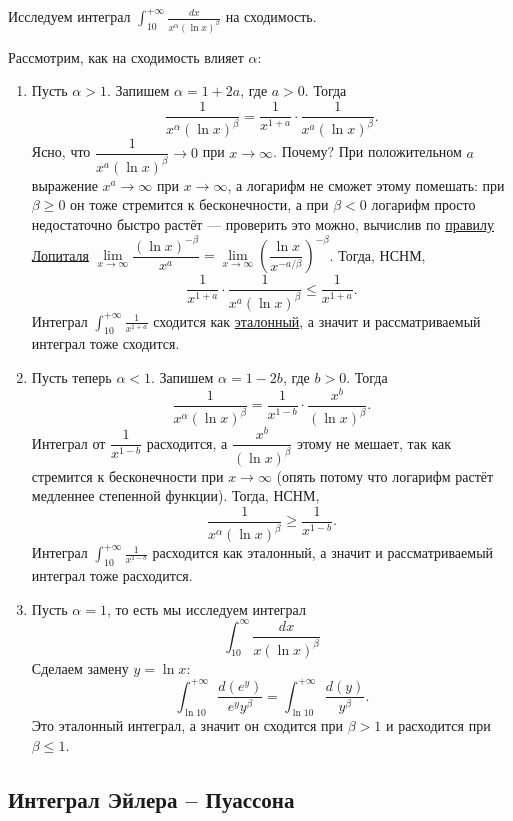 \begin{example}
	Исследуем интеграл $\displaystyle \int_{10}^{+\infty} \frac{dx}{x^\alpha (\ln x)^\beta}$ на сходимость.
	
	Рассмотрим, как на сходимость влияет \(\alpha\):
	\begin{enumerate}
		\item Пусть \(\alpha > 1\). Запишем \(\alpha = 1 + 2a\), где \(a > 0\). Тогда \[
		\frac{1}{x^\alpha (\ln x)^\beta} = \frac{1}{x^{1+a}} \cdot \frac{1}{x^a (\ln x)^\beta}.
		\]
		Ясно, что \(\dfrac{1}{x^a (\ln x)^\beta} \to 0\) при \(x \to \infty\). Почему? При положительном \(a\) выражение \(x^a \to \infty\) при \(x \to \infty\), а логарифм не сможет этому помешать: при \(\beta \geqslant 0\) он тоже стремится к бесконечности, а при \(\beta < 0\) логарифм просто недостаточно быстро растёт --- проверить это можно, вычислив по \hyperlink{t3}{правилу Лопиталя} \(\lim\limits_{x \to \infty} \dfrac{(\ln x)^{-\beta}}{x^a} = \lim\limits_{x \to \infty} \left(\dfrac{\ln x}{x^{-a/\beta}} \right)^{-\beta}\).
		Тогда, НСНМ, \[
		\frac{1}{x^{1 + a}} \cdot \frac{1}{x^a (\ln x)^\beta} \leqslant 	\frac{1}{x^{1 + a}}.
		\]
		Интеграл \(\displaystyle \int_{10}^{+\infty} \frac{1}{x^{1 + a}}\) сходится как \hyperlink{etint}{эталонный}, а значит и рассматриваемый интеграл тоже сходится.
		\item Пусть теперь \(\alpha < 1\). Запишем \(\alpha = 1 - 2b\), где \(b > 0\). Тогда \[
		\frac{1}{x^\alpha (\ln x)^\beta} = \frac{1}{x^{1 - b}} \cdot \frac{x^b}{(\ln x)^\beta}.
		\]
		Интеграл от \(\dfrac{1}{x^{1 - b}}\) расходится, а \(\dfrac{x^b}{(\ln x)^\beta}\) этому не мешает, так как стремится к бесконечности при \(x \to \infty\) (опять потому что логарифм растёт медленнее степенной функции).
		Тогда, НСНМ, \[
		\frac{1}{x^\alpha (\ln x)^\beta} \geqslant \frac{1}{x^{1 - b}}.
		\]
		Интеграл \(\displaystyle \int_{10}^{+\infty} \frac{1}{x^{1 - b}}\) расходится как эталонный, а значит и рассматриваемый интеграл тоже расходится.
		\item Пусть \(\alpha = 1\), то есть мы исследуем интеграл \[
		\int_{10}^\infty \frac{dx}{x (\ln x)^\beta}
		\]
		Сделаем замену \(y = \ln x\): \[
		\int_{\ln 10}^{+\infty} \frac{d(e^y)}{e^y y^\beta} = \int_{\ln 10}^{+\infty} \frac{d(y)}{y^\beta}.
		\]
		Это эталонный интеграл, а значит он сходится при  \(\beta > 1\) и расходится при  \(\beta \leqslant 1\).
	\end{enumerate}
\end{example}

\subsection{Интеграл Эйлера -- Пуассона}

